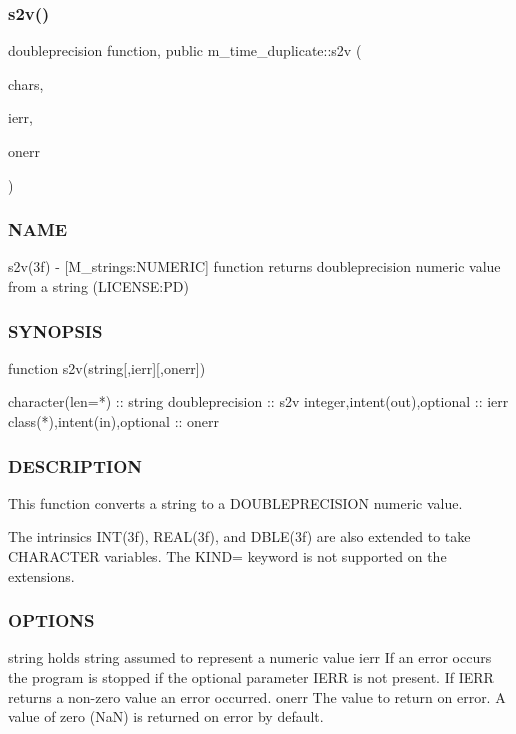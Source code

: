 \subsubsection{\texorpdfstring{s2v()}{s2v()}}
{\footnotesize\ttfamily doubleprecision function, public m\+\_\+time\+\_\+duplicate\+::s2v (\begin{DoxyParamCaption}\item[{character(len=$\ast$), intent(in)}]{chars,  }\item[{integer, optional}]{ierr,  }\item[{class($\ast$), intent(in), optional}]{onerr }\end{DoxyParamCaption})}



\subsubsection*{N\+A\+ME}

s2v(3f) -\/ \mbox{[}M\+\_\+strings\+:N\+U\+M\+E\+R\+IC\mbox{]} function returns doubleprecision numeric value from a string (L\+I\+C\+E\+N\+SE\+:PD) 

\subsubsection*{S\+Y\+N\+O\+P\+S\+IS}

\begin{DoxyVerb}function s2v(string[,ierr][,onerr])

 character(len=*)             :: string
 doubleprecision              :: s2v
 integer,intent(out),optional :: ierr
 class(*),intent(in),optional :: onerr
\end{DoxyVerb}
 \subsubsection*{D\+E\+S\+C\+R\+I\+P\+T\+I\+ON}

This function converts a string to a D\+O\+U\+B\+L\+E\+P\+R\+E\+C\+I\+S\+I\+ON numeric value.

The intrinsics I\+N\+T(3f), R\+E\+A\+L(3f), and D\+B\+L\+E(3f) are also extended to take C\+H\+A\+R\+A\+C\+T\+ER variables. The K\+I\+ND= keyword is not supported on the extensions. \subsubsection*{O\+P\+T\+I\+O\+NS}

\begin{DoxyVerb} string   holds string assumed to represent a numeric value
 ierr     If an error occurs the program is stopped if the optional
          parameter IERR is not present. If IERR returns a non-zero
          value an error occurred.
 onerr    The value to return on error. A value of zero (NaN) is
          returned on error by default.
\end{DoxyVerb}
